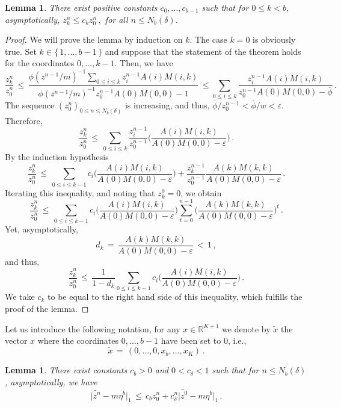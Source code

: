 \documentclass[a4paper,12pt]{article}
\newtheorem{lemma}[theorem]{Lemma}
\theoremstyle{definition}
\theoremstyle{remark}
\def \d {\delta}
\def \e {\varepsilon}
\def \R {\mathbb{R}}
\begin{document}
\begin{lemma}
There exist positive constants $c_0,\dots,c_{b-1}$
such that for $0\leq k<b$,
asymptotically,
$z_k^n\leq c_kz_0^n\,,$
for all $n\leq N_b(\d)$.
\end{lemma}
\begin{proof}
We will prove the lemma by induction on $k$.
The case $k=0$ is obviously true.
Set $k\in\lbrace\,1,\dots,b-1\,\rbrace$
and suppose that the statement of the theorem holds for 
the coordinates $0,\dots,k-1$. Then, we have
$$\frac{z^n_k}{z^n_0}\,\leq\,
\frac{\displaystyle\phi(z^{n-1}/m)^{-1}
\sum_{0\leq i\leq k}z^{n-1}_iA(i)M(i,k)}{\displaystyle\phi(z^{n-1}/m)^{-1}z^{n-1}_0A(0)M(0,0)-1}\,
\leq\sum_{0\leq i\leq k}\frac{z^{n-1}_iA(i)M(i,k)}
{z^{n-1}_0A(0)M(0,0)-\overline{\phi}}\,.
$$
The sequence $(z^n_0)_{0\leq n\leq N_b(\d)}$ is increasing,
and thus, $\overline{\phi}/z^{n-1}_0<\overline{\phi}/w<\e$.
Therefore,
$$\frac{z^n_k}{z^n_0}\,\leq\,
\sum_{0\leq i\leq k}\frac{z^{n-1}_i}{z^{n-1}_0}\bigg(
\frac{A(i)M(i,k)}{A(0)M(0,0)-\e}
\bigg)\,.$$
By the induction hypothesis
$$\frac{z^n_k}{z^n_0}\,\leq\,
\sum_{0\leq i\leq k-1}c_i\bigg(
\frac{A(i)M(i,k)}{A(0)M(0,0)-\e}
\bigg)
+\frac{z^{n-1}_k}{z^{n-1}_0}\frac{A(k)M(k,k)}{A(0)M(0,0)-\e}\,.$$
Iterating this inequality,
and noting that $z^0_k=0$, we obtain
$$\frac{z^n_k}{z^n_0}\,\leq\,
\sum_{0\leq i\leq k-1}c_i\bigg(
\frac{A(i)M(i,k)}{A(0)M(0,0)-\e}
\bigg)\sum_{t=0}^{n-1}
\bigg(\frac{A(k)M(k,k)}{A(0)M(0,0)-\e}\bigg)^t\,.$$
Yet, asymptotically,
$$d_k\,=\,\frac{A(k)M(k,k)}{A(0)M(0,0)-\e}\,<\,1\,,$$
and thus,
$$\frac{z^n_k}{z^n_0}\,\leq\,\frac{1}{1-d_k}\sum_{0\leq i\leq k-1}c_i\bigg(
\frac{A(i)M(i,k)}{A(0)M(0,0)-\e}\bigg)\,.$$
We take $c_k$ to be equal to the right hand side
of this inequality, which fulfills the proof of the lemma.
\end{proof}
Let us introduce the following notation, for any $x\in\R^{K+1}$
we denote by $\widetilde{x}$ the vector $x$ where the 
coordinates $0,\dots,b-1$ have been set to $0$, i.e.,
$$\widetilde{x}\,=\,(0,\dots,0,x_b,\dots,x_K)\,.$$
\begin{lemma}
There exist constants $c_b>0$
and $0<c_\d<1$
such that
for $n\leq N_b(\d)$, 
asymptotically,
we have
$$\big|\widetilde{z^{n}}-m\eta^b\big|_1
\,\leq\,
c_b z^n_0+c_\d^n\big|
\widetilde{z^0}-m\eta^b
\big|_1\,.
$$
\end{lemma}
\end{document}
